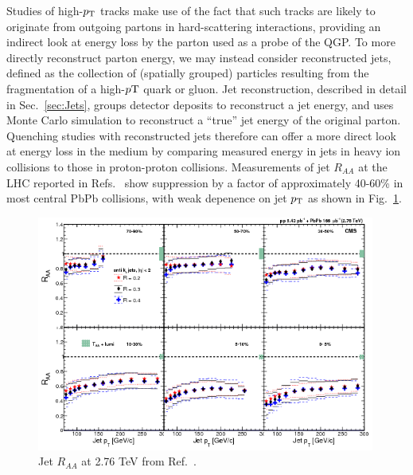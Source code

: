 Studies of high-$p_{\rm T}$ tracks make use of the fact that such tracks are likely to originate from outgoing partons in hard-scattering interactions, providing an indirect look at energy loss by the parton used as a probe of the QGP.  To more directly reconstruct parton energy, we may instead consider reconstructed jets, defined as the collection of (spatially grouped) particles resulting from the fragmentation of a high-$p{\rm T}$ quark or gluon.  Jet reconstruction, described in detail in Sec.~\ref{sec:Jets}, groups detector deposits to reconstruct a jet energy, and uses Monte Carlo simulation to reconstruct a ``true'' jet energy of the original parton.  Quenching studies with reconstructed jets therefore can offer a more direct look at energy loss in the medium by comparing measured energy in jets in heavy ion collisions to those in proton-proton collisions.  Measurements of jet $R_{AA}$ at the LHC reported in Refs.~\cite{Aad:2014bxa, Khachatryan:2016jfl} show suppression by a factor of approximately 40-60\% in most central PbPb collisions, with weak depenence on jet $p_{\rm T}$ as shown in Fig.~\ref{fig:cms_jet_raa}.  

\begin{figure}[h!]
\begin{center}
\includegraphics[width=0.99\textwidth]{figures/Theory/JetRaa_CMS.png}
\caption[Jet $R_{AA}$ at 2.76 TeV]{Jet $R_{AA}$ at 2.76 TeV from Ref.~\cite{Khachatryan:2016jfl}.}
\label{fig:cms_jet_raa}
\end{center}
\end{figure}


